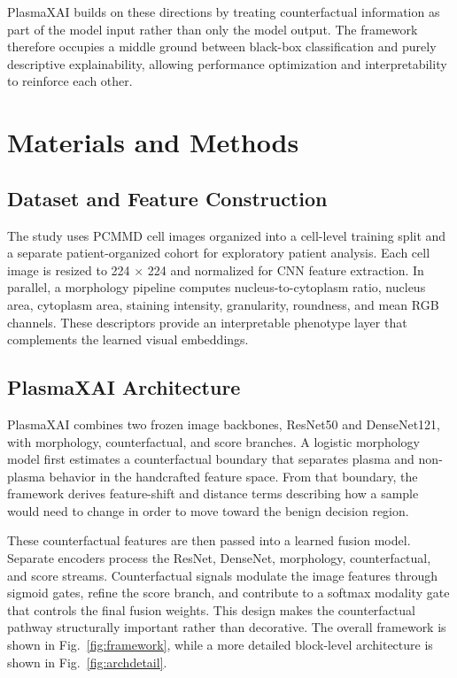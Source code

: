 \documentclass[runningheads]{llncs}
\begin{document}
PlasmaXAI builds on these directions by treating counterfactual information as part of the model input rather than only the model output. The framework therefore occupies a middle ground between black-box classification and purely descriptive explainability, allowing performance optimization and interpretability to reinforce each other.

\section{Materials and Methods}
\subsection{Dataset and Feature Construction}
The study uses PCMMD cell images organized into a cell-level training split and a separate patient-organized cohort for exploratory patient analysis. Each cell image is resized to 224 $\times$ 224 and normalized for CNN feature extraction. In parallel, a morphology pipeline computes nucleus-to-cytoplasm ratio, nucleus area, cytoplasm area, staining intensity, granularity, roundness, and mean RGB channels. These descriptors provide an interpretable phenotype layer that complements the learned visual embeddings.

\subsection{PlasmaXAI Architecture}
PlasmaXAI combines two frozen image backbones, ResNet50 and DenseNet121, with morphology, counterfactual, and score branches. A logistic morphology model first estimates a counterfactual boundary that separates plasma and non-plasma behavior in the handcrafted feature space. From that boundary, the framework derives feature-shift and distance terms describing how a sample would need to change in order to move toward the benign decision region.

These counterfactual features are then passed into a learned fusion model. Separate encoders process the ResNet, DenseNet, morphology, counterfactual, and score streams. Counterfactual signals modulate the image features through sigmoid gates, refine the score branch, and contribute to a softmax modality gate that controls the final fusion weights. This design makes the counterfactual pathway structurally important rather than decorative. The overall framework is shown in Fig.~\ref{fig:framework}, while a more detailed block-level architecture is shown in Fig.~\ref{fig:archdetail}.
\end{document}
